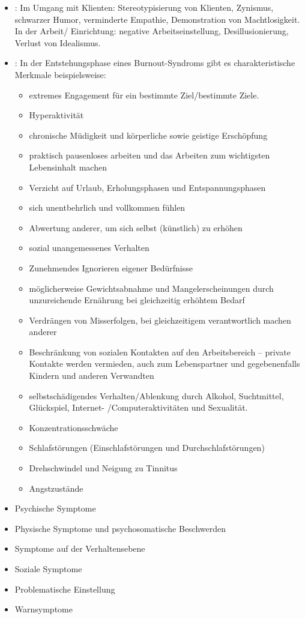 {\begin{itemize}
  \item {}:
  Im Umgang mit Klienten: Stereotypisierung von Klienten,
  Zynismus, schwarzer Humor, verminderte Empathie,
  Demonstration von Machtlosigkeit. In der Arbeit/
  Einrichtung: negative Arbeitseinstellung, Desillusionierung,
  Verlust von Idealismus.
  \item {}: In der Entstehungsphase eines Burnout-Syndroms gibt es
  charakteristische Merkmale beispielsweise:
  \begin{itemize}
    \item extremes Engagement für ein bestimmte Ziel/bestimmte Ziele.
    \item Hyperaktivität
    \item chronische Müdigkeit und körperliche sowie geistige Erschöpfung
    \item praktisch pausenloses arbeiten und das Arbeiten zum
    wichtigsten Lebensinhalt machen
    \item Verzicht auf Urlaub, Erholungsphasen und Entspannungsphasen
    \item sich unentbehrlich und vollkommen fühlen
    \item Abwertung anderer, um sich selbst (künstlich) zu erhöhen
    \item sozial unangemessenes Verhalten
    \item Zunehmendes Ignorieren eigener Bedürfnisse
    \item möglicherweise Gewichtsabnahme und
    Mangelerscheinungen durch unzureichende Ernährung bei
    gleichzeitig erhöhtem Bedarf
    \item Verdrängen von Misserfolgen, bei gleichzeitigem
    verantwortlich machen anderer
    \item Beschränkung von sozialen Kontakten auf den
    Arbeitsbereich – private Kontakte werden vermieden, auch
    zum Lebenspartner und gegebenenfalls Kindern und anderen
    Verwandten
    \item selbstschädigendes Verhalten/Ablenkung durch
    Alkohol, Suchtmittel, Glückspiel, Internet-
    /Computeraktivitäten und Sexualität.
    \item Konzentrationsschwäche
    \item Schlafstörungen (Einschlafstörungen und Durchschlafstörungen)
    \item Drehschwindel und Neigung zu Tinnitus
    \item Angstzustände
  \end{itemize}
\end{itemize}
}
{
\begin{itemize}
  \item {Psychische Symptome}
  \item {Physische Symptome und psychosomatische Beschwerden}
  \item {Symptome auf der Verhaltensebene}
  \item {Soziale Symptome}
  \item {Problematische Einstellung}
  \item {Warnsymptome}
\end{itemize}
}
{}
{}
{}

